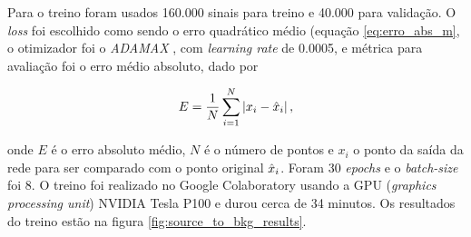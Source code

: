 \documentclass[a4paper,12pt,oneside]{book}
\begin{document}
\par Para o treino foram usados 160.000 sinais para treino e 40.000 para validação. O \textit{loss} foi escolhido como sendo o erro quadrático médio (equação \ref{eq:erro_abs_m}, o otimizador foi o \textit{ADAMAX} \cite{ADAMAX}, com \textit{learning rate} de 0.0005, e métrica para avaliação foi o erro médio absoluto, dado por

\begin{equation}\label{eq:erro_abs_m}
    E = \frac{1}{N}\sum_{i = 1}^{N} \left | x_i - \Hat{x}_i\right |,
\end{equation}

onde $E$ é o erro absoluto médio, $N$ é o número de pontos e $x_i$ o ponto da saída da rede para ser comparado com o ponto original $\Hat{x}_i$. Foram 30 \textit{epochs} e o \textit{batch-size} foi 8. O treino foi realizado no Google Colaboratory \cite{google_colab} usando a GPU (\textit{graphics processing unit}) NVIDIA Tesla P100 e durou cerca de 34 minutos. Os resultados do treino estão na figura \ref{fig:source_to_bkg_results}.

\end{document}
